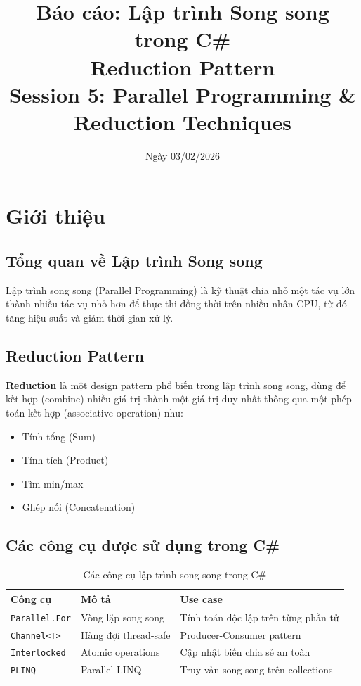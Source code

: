 \documentclass[12pt,a4paper]{article}
\title{
    \vspace{-1cm}
    \textbf{Báo cáo: Lập trình Song song trong C\#}\\
    \Large Reduction Pattern\\
    \vspace{0.5cm}
    \large Session 5: Parallel Programming \& Reduction Techniques
}
\author{}
\date{Ngày 03/02/2026}
\begin{document}
\maketitle
\thispagestyle{empty}

\vspace{1cm}

\tableofcontents
\newpage

\section{Giới thiệu}

\subsection{Tổng quan về Lập trình Song song}

Lập trình song song (Parallel Programming) là kỹ thuật chia nhỏ một tác vụ lớn thành nhiều tác vụ nhỏ hơn để thực thi đồng thời trên nhiều nhân CPU, từ đó tăng hiệu suất và giảm thời gian xử lý.

\subsection{Reduction Pattern}

\textbf{Reduction} là một design pattern phổ biến trong lập trình song song, dùng để kết hợp (combine) nhiều giá trị thành một giá trị duy nhất thông qua một phép toán kết hợp (associative operation) như:

\begin{itemize}
    \item Tính tổng (Sum)
    \item Tính tích (Product)
    \item Tìm min/max
    \item Ghép nối (Concatenation)
\end{itemize}

\subsection{Các công cụ được sử dụng trong C\#}

\begin{table}[h]
\centering
\begin{tabular}{|l|l|l|}
\hline
\textbf{Công cụ} & \textbf{Mô tả} & \textbf{Use case} \\
\hline
\texttt{Parallel.For} & Vòng lặp song song & Tính toán độc lập trên từng phần tử \\
\hline
\texttt{Channel<T>} & Hàng đợi thread-safe & Producer-Consumer pattern \\
\hline
\texttt{Interlocked} & Atomic operations & Cập nhật biến chia sẻ an toàn \\
\hline
\texttt{PLINQ} & Parallel LINQ & Truy vấn song song trên collections \\
\hline
\end{tabular}
\caption{Các công cụ lập trình song song trong C\#}
\end{table}
\end{document}
